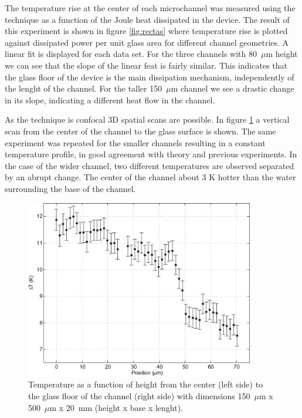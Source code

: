 \documentclass[]{spie}  %
\newcommand{\figsimple}{10cm} %
\begin{document}
The temperature rise at the center of each microchannel was measured using the technique as a function of the Joule heat dissipated in the device. The result of this experiment is shown in figure \ref{fig:rectas} where temperature rise is plotted against dissipated power per unit glass area for different channel geometries. A linear fit is displayed for each data set. For the three channels with 80~$\mu$m height we can see that the slope of the linear feat is fairly similar. This indicates that the glass floor of the device is the main dissipation mechanism, independently of the lenght of the channel. For the taller 150~$\mu$m channel we see a drastic change in its slope, indicating a different heat flow in the channel.  

As the technique is confocal 3D spatial scans are possible. In figure \ref{fig:vertical} a vertical scan from the center of the channel to the glass surface is shown. The same experiment was repeated for the smaller channels resulting in a constant temperature profile, in good agreement with theory and previous experiments. In the case of the wider channel, two different temperatures are observed separated by an abrupt change. The center of the channel about 3 K hotter than the water surrounding the base of the channel. 

\begin{figure}[h!]
\centering
\includegraphics[width=\figsimple]{figs/fig4.eps}
\caption{Temperature as a function of height from the center (left side) to the glass floor of the channel (right side) with dimensions 150~$\mu$m x 500~$\mu$m x 20~mm (height x base x lenght).\label{fig:vertical}}
\end{figure}
\end{document}
